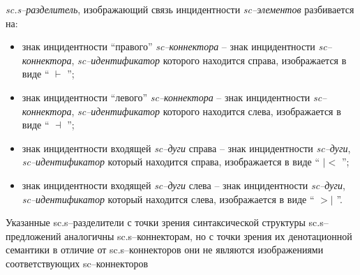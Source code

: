 \textit{sc.s--разделитель}, изображающий связь инцидентности \textit{sc--элементов} разбивается на:
\begin{itemize}
	\item знак инцидентности “правого” \textit{sc--коннектора} -- знак инцидентности \textit{sc--коннектора}, \textit{sc--идентификатор} которого находится справа, изображается в виде `` $ \vdash$ ''{};
	\item знак инцидентности “левого” \textit{sc--коннектора} -- знак инцидентности \textit{sc--коннектора}, \textit{sc--идентификатор} которого находится слева, изображается в виде `` $ \dashv$ ''{};
	\item знак инцидентности входящей \textit{sc--дуги} справа -- знак инцидентности \textit{sc--дуги}, \textit{sc--идентификатор} который находится справа, изображается в виде `` $ |<$ ''{};
	\item знак инцидентности входящей \textit{sc--дуги} слева -- знак инцидентности \textit{sc--дуги}, \textit{sc--идентификатор} который находится слева, изображается в виде `` $ >| $ ''{}.
\end{itemize}


Указанные sc.s--разделители с точки зрения синтаксической структуры sc.s--предложений аналогичны sc.s--коннекторам, но с точки зрения их денотационной семантики в отличие от sc.s--коннекторов они не являются изображениями соответствующих sc--коннекторов
\newpage
{}

